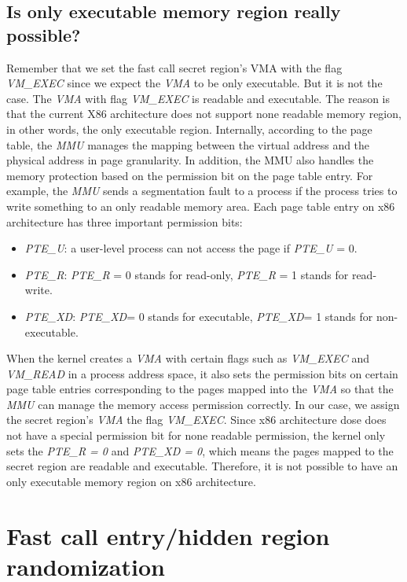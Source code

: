 \subsection{Is only executable memory region really possible?}

Remember that we set the fast call secret region's VMA with the flag \emph{VM\_EXEC} 
since we expect the \emph{VMA} to be only executable. But it is not the case. The \emph{VMA} 
with flag \emph{VM\_EXEC} is readable and executable. The reason is that the current X86 architecture does not support none readable memory region, in other words, the only executable region.  
Internally, according to the page table, the \emph{MMU} manages the mapping between the virtual address and the physical address in page granularity. In addition, the MMU also handles the memory 
protection based on the permission bit on the page table entry. For example, the \emph{MMU} sends a segmentation fault to a process if the process tries to write something to an only readable memory area. 
Each page table entry on x86 architecture has three important permission bits:

\begin{itemize}
  \item \emph{PTE\_U}:  a user-level process can not access the page if \emph{PTE\_U} = 0. 
  \item \emph{PTE\_R}:  \emph{PTE\_R} = 0 stands  for read-only, \emph{PTE\_R} = 1 stands for read-write.
  \item \emph{PTE\_XD}: \emph{PTE\_XD}= 0 stands for executable, \emph{PTE\_XD}= 1 stands for non-executable.
\end{itemize}

When the kernel creates a \emph{VMA} with certain flags such as \emph{VM\_EXEC} and \emph{VM\_READ} in a process address space,  it also sets the permission bits on certain page 
table entries corresponding to the pages mapped into the \emph{VMA} so that the \emph{MMU} can manage the memory access permission correctly. In our case, we assign the secret region's \emph{VMA} the flag 
\emph{VM\_EXEC}. Since x86 architecture dose does not have a special permission bit for none readable permission, the kernel only sets the \emph{PTE\_R = 0} and \emph{PTE\_XD = 0}, which means the pages mapped to the secret region are readable and executable.  
Therefore, it is not possible to have an only executable memory region on x86 architecture.


\section{Fast call entry/hidden region randomization}


